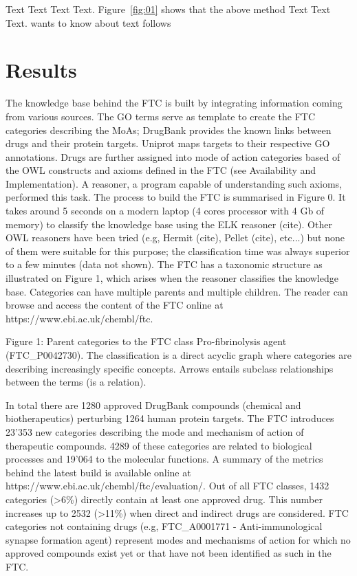 \documentclass{bioinfo}
\begin{document}
 Text Text Text Text. Figure~\ref{fig:01} shows that the above method  Text 
   Text Text.  \citep{Bag01} wants to know about text follows

\section{Results}

The knowledge base behind the FTC is built by integrating information coming from various sources. 
The GO terms serve as template to create the FTC categories describing the MoAs; DrugBank provides the 
known links between drugs and their protein targets. Uniprot maps targets to their respective GO annotations. 
Drugs are further assigned into mode of action categories based of the OWL constructs and axioms defined in the 
FTC (see Availability and Implementation). A reasoner, a program capable of understanding such axioms, performed this task. 
The process to build the FTC is summarised in Figure 0. It takes around 5 seconds on a modern 
laptop (4 cores processor with 4 Gb of memory) to classify the knowledge base using the ELK reasoner (cite). 
Other OWL reasoners have been tried (e.g, Hermit (cite), Pellet (cite), etc...) but none of them were suitable for this purpose; 
the classification time was always superior to a few minutes (data not shown). The FTC has a taxonomic structure as illustrated 
on Figure 1, which arises when the reasoner classifies the knowledge base. Categories can have multiple parents and multiple children. 
The reader can browse and access the content of the FTC online at {{https://www.ebi.ac.uk/chembl/ftc}}.

Figure 1: Parent categories to the FTC class Pro-fibrinolysis agent (FTC\_P0042730). The classification is a direct 
acyclic graph where categories are describing increasingly specific concepts. Arrows entails subclass relationships 
between the terms (is a relation).

In total there are 1280 approved DrugBank compounds (chemical and biotherapeutics) perturbing 1264 human protein targets. 
The FTC introduces 23'353 new categories describing the mode and mechanism of action of therapeutic compounds. 4289 of these 
categories are related to biological processes and 19'064 to the molecular functions. A summary of the metrics behind the latest 
build is available online at {{https://www.ebi.ac.uk/chembl/ftc/evaluation/}}. Out of all FTC classes, 1432 
categories (\textgreater 6\%) directly contain at least one approved drug. This number increases up to 2532 (\textgreater 11\%) 
when direct and 
indirect drugs are considered. FTC categories not containing drugs (e.g, FTC\_A0001771 - Anti-immunological synapse 
formation agent) represent modes and mechanisms of action for which no approved compounds exist yet or that have not been identified 
as such in the FTC.
\end{document}

